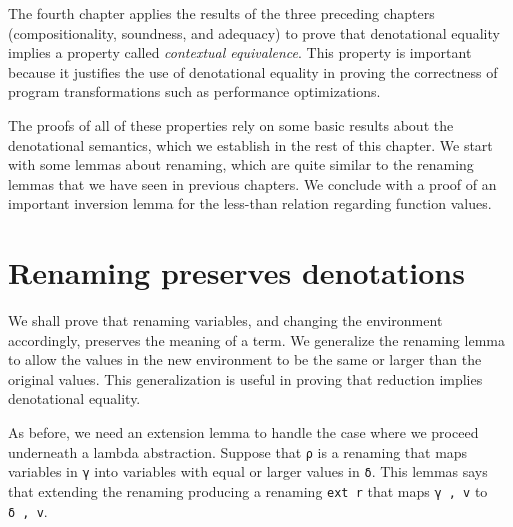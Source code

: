 The fourth chapter applies the results of the three preceding chapters
(compositionality, soundness, and adequacy) to prove that denotational
equality implies a property called \emph{contextual equivalence}. This
property is important because it justifies the use of denotational
equality in proving the correctness of program transformations such as
performance optimizations.

The proofs of all of these properties rely on some basic results about
the denotational semantics, which we establish in the rest of this
chapter. We start with some lemmas about renaming, which are quite
similar to the renaming lemmas that we have seen in previous chapters.
We conclude with a proof of an important inversion lemma for the
less-than relation regarding function values.

\hypertarget{renaming-preserves-denotations}{%
\section{Renaming preserves
denotations}\label{renaming-preserves-denotations}}

We shall prove that renaming variables, and changing the environment
accordingly, preserves the meaning of a term. We generalize the renaming
lemma to allow the values in the new environment to be the same or
larger than the original values. This generalization is useful in
proving that reduction implies denotational equality.

As before, we need an extension lemma to handle the case where we
proceed underneath a lambda abstraction. Suppose that \texttt{ρ} is a
renaming that maps variables in \texttt{γ} into variables with equal or
larger values in \texttt{δ}. This lemmas says that extending the
renaming producing a renaming \texttt{ext\ r} that maps \texttt{γ\ ,\ v}
to \texttt{δ\ ,\ v}.

